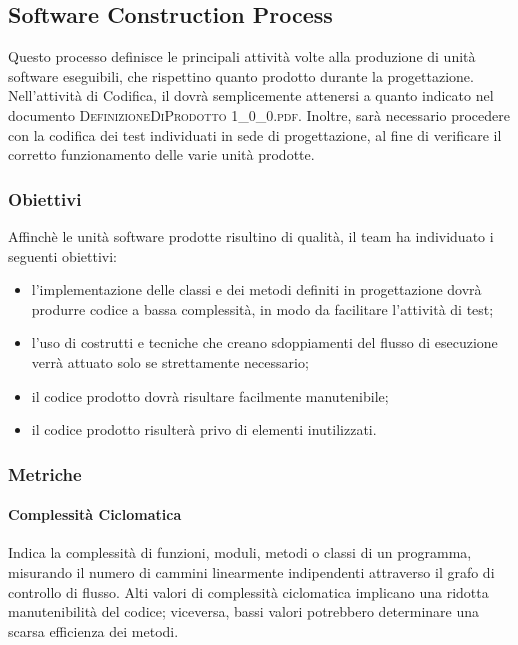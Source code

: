 			
	\subsection{Software Construction Process}
	Questo processo definisce le principali attività volte alla produzione di unità software eseguibili, che
	rispettino quanto prodotto durante la progettazione.
	Nell’attività di Codifica, il \textit{\Progr} dovrà semplicemente attenersi a quanto indicato nel documento \textsc{DefinizioneDiProdotto 1\_0\_0.pdf}. Inoltre, sarà necessario procedere con la codifica dei test individuati in sede di progettazione, al fine di verificare il corretto funzionamento delle varie unità prodotte.
		
		\subsubsection{Obiettivi}
		Affinchè le unità software prodotte risultino di qualità, il team ha individuato i seguenti obiettivi:
		\begin{itemize}
			\item l’implementazione delle classi e dei metodi definiti in progettazione dovrà produrre codice a bassa complessità, in modo da facilitare l'attività di test;
			\item l’uso di costrutti e tecniche che creano sdoppiamenti del flusso di esecuzione verrà attuato solo se strettamente necessario;
			\item il codice prodotto dovrà risultare facilmente manutenibile;
			\item il codice prodotto risulterà privo di elementi inutilizzati.
		\end{itemize}
		
		\subsubsection{Metriche}
			
			\paragraph{Complessità Ciclomatica}
			Indica la complessità di funzioni, moduli, metodi o classi di un programma, misurando il numero
			di cammini linearmente indipendenti attraverso il grafo di controllo di flusso. Alti valori di complessità ciclomatica implicano una ridotta manutenibilità del codice; viceversa, bassi valori potrebbero determinare una scarsa efficienza dei metodi.
			
